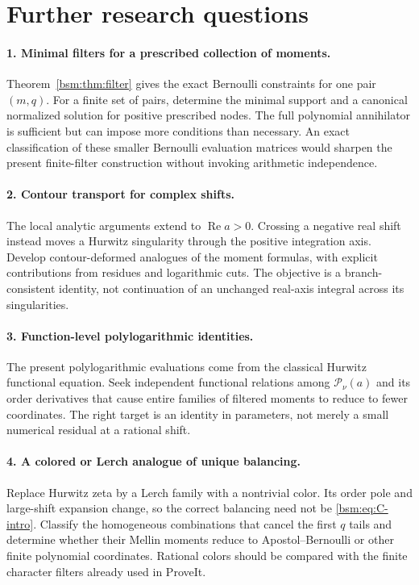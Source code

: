 \documentclass[11pt,letterpaper]{article}
\numberwithin{equation}{section}
\theoremstyle{definition}\newtheorem{definition}[theorem]{Definition}
\theoremstyle{remark}\newtheorem{remark}[theorem]{Remark}
\DeclareMathOperator{\Ree}{Re}
\begin{document}
\section{Further research questions}\label{bsm:sec:further}

\paragraph{1. Minimal filters for a prescribed collection of moments.}
Theorem~\ref{bsm:thm:filter} gives the exact Bernoulli constraints for one
pair $(m,q)$. For a finite set of pairs, determine the minimal support
and a canonical normalized solution for positive prescribed nodes.
The full polynomial annihilator is sufficient but can impose more
conditions than necessary. An exact classification of these smaller
Bernoulli evaluation matrices would sharpen the present finite-filter
construction without invoking arithmetic independence.

\paragraph{2. Contour transport for complex shifts.}
The local analytic arguments extend to $\Ree a>0$. Crossing a negative
real shift instead moves a Hurwitz singularity through the positive
integration axis. Develop contour-deformed analogues of the moment
formulas, with explicit contributions from residues and logarithmic
cuts. The objective is a branch-consistent identity, not continuation
of an unchanged real-axis integral across its singularities.

\paragraph{3. Function-level polylogarithmic identities.}
The present polylogarithmic evaluations come from the classical
Hurwitz functional equation. Seek independent functional relations
among $\mathcal P_\nu(a)$ and its order derivatives that cause entire
families of filtered moments to reduce to fewer coordinates. The
right target is an identity in parameters, not merely a small
numerical residual at a rational shift.

\paragraph{4. A colored or Lerch analogue of unique balancing.}
Replace Hurwitz zeta by a Lerch family with a nontrivial color. Its
order pole and large-shift expansion change, so the correct balancing
need not be \eqref{bsm:eq:C-intro}. Classify the homogeneous combinations
that cancel the first $q$ tails and determine whether their Mellin
moments reduce to Apostol--Bernoulli or other finite polynomial
coordinates. Rational colors should be compared with the finite
character filters already used in ProveIt.
\end{document}
